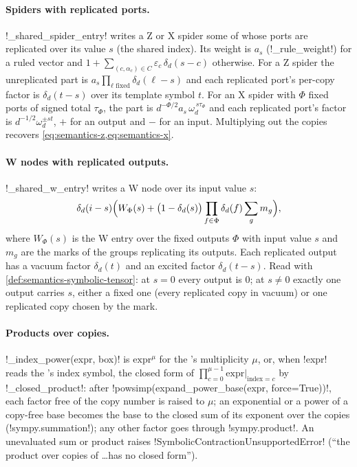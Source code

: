 \paragraph{Spiders with replicated ports.} \py!_shared_spider_entry! writes a Z or X spider some of whose ports are replicated over its value $s$ (the shared index). Its weight is $a_s$ (\py!_rule_weight!) for a ruled vector and $1+\sum_{(c,\alpha_c)\in C}\varepsilon_c\,\delta_d(s-c)$ otherwise. For a Z spider the unreplicated part is $a_s\prod_{\ell\text{ fixed}}\delta_d(\ell-s)$ and each replicated port's per-copy factor is $\delta_d(t-s)$ over its template symbol $t$. For an X spider with $\Phi$ fixed ports of signed total $\tau_\Phi$, the part is $d^{-\Phi/2}a_s\,\omega_d^{\,s\tau_\Phi}$ and each replicated port's factor is $d^{-1/2}\omega_d^{\pm st}$, $+$ for an output and $-$ for an input. Multiplying out the copies recovers \cref{eq:semantics-z,eq:semantics-x}.

\paragraph{W nodes with replicated outputs.} \py!_shared_w_entry! writes a W node over its input value $s$:
\[
\delta_d(i-s)\Bigl(W_\Phi(s)+\bigl(1-\delta_d(s)\bigr)\prod_{f\in\Phi}\delta_d(f)\sum_g m_g\Bigr),
\]
where $W_\Phi(s)$ is the W entry over the fixed outputs $\Phi$ with input value $s$ and $m_g$ are the marks of the groups replicating its outputs. Each replicated output has a vacuum factor $\delta_d(t)$ and an excited factor $\delta_d(t-s)$. Read with \cref{def:semantics-symbolic-tensor}: at $s=0$ every output is $0$; at $s\ne0$ exactly one output carries $s$, either a fixed one (every replicated copy in vacuum) or one replicated copy chosen by the mark.

\paragraph{Products over copies.} \py!_index_power(expr, box)! is $\text{expr}^{\mu}$ for the \bbox{}'s multiplicity $\mu$, or, when \py!expr! reads the \bbox{}'s index symbol, the closed form of $\prod_{c=0}^{\mu-1}\text{expr}|_{\text{index}=c}$ by \py!_closed_product!: after \py!powsimp(expand_power_base(expr, force=True))!, each factor free of the copy number is raised to $\mu$; an exponential or a power of a copy-free base becomes the base to the closed sum of its exponent over the copies (\py!sympy.summation!); any other factor goes through \py!sympy.product!. An unevaluated sum or product raises \py!SymbolicContractionUnsupportedError! (``the product over copies of \ldots has no closed form'').


